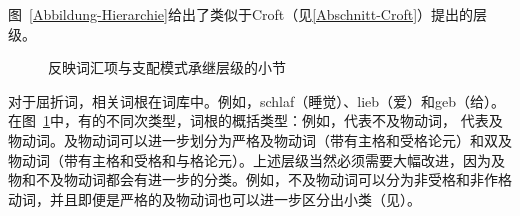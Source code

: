 图~\vref{Abbildung-Hierarchie}给出了类似于Croft（见\ref{Abschnitt-Croft}）提出的层级。
\begin{figure}
\caption{\label{Abbildung-Hierarchie}反映词汇项与支配模式承继层级的小节}
\end{figure}%
对于屈折词，相关词根在词库中。例如，schlaf（睡觉）、lieb（爱）和geb（给）。在图~\ref{Abbildung-Hierarchie}中，有的不同次类型，词根的概括类型：例如，代表不及物动词， 代表及物动词。及物动词可以进一步划分为严格及物动词（带有主格和受格论元）和双及物动词（带有主格和受格和与格论元）。上述层级当然必须需要大幅改进，因为及物和不及物动词都会有进一步的分类。例如，不及物动词可以分为非受格和非作格动词，并且即便是严格的及物动词也可以进一步区分出小类（见\citealp[\S~2]{Welke2009a}）。

